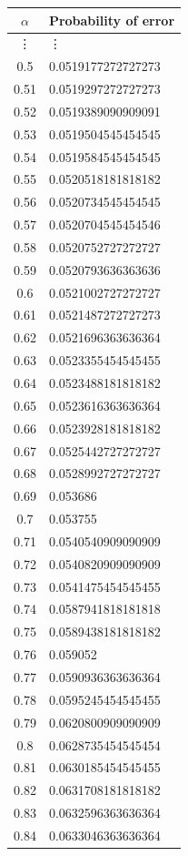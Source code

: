 \documentclass[11pt]{extarticle}
\begin{document}
\begin{enumerate}[(a)]
\begin{table}[ht!]
\begin{minipage}{0.4\textwidth}
\tiny
\begin{tabular}{cl}
\toprule
\textbf{$\alpha$} & \textbf{Probability of error} \\
\midrule
\vdots & \vdots \\
0.5 & 0.0519177272727273 \\
0.51 & 0.0519297272727273 \\
0.52 & 0.0519389090909091 \\
0.53 & 0.0519504545454545 \\
0.54 & 0.0519584545454545 \\
0.55 & 0.0520518181818182 \\
0.56 & 0.0520734545454545 \\
0.57 & 0.0520704545454546 \\
0.58 & 0.0520752727272727 \\
0.59 & 0.0520793636363636 \\
0.6 & 0.0521002727272727 \\
0.61 & 0.0521487272727273 \\
0.62 & 0.0521696363636364 \\
0.63 & 0.0523355454545455 \\
0.64 & 0.0523488181818182 \\
0.65 & 0.0523616363636364 \\
0.66 & 0.0523928181818182 \\
0.67 & 0.0525442727272727 \\
0.68 & 0.0528992727272727 \\
0.69 & 0.053686 \\
0.7 & 0.053755 \\
0.71 & 0.0540540909090909 \\
0.72 & 0.0540820909090909 \\
0.73 & 0.0541475454545455 \\
0.74 & 0.0587941818181818 \\
0.75 & 0.0589438181818182 \\
0.76 & 0.059052 \\
0.77 & 0.0590936363636364 \\
0.78 & 0.0595245454545455 \\
0.79 & 0.0620800909090909 \\
0.8 & 0.0628735454545454 \\
0.81 & 0.0630185454545455 \\
0.82 & 0.0631708181818182 \\
0.83 & 0.0632596363636364 \\
0.84 & 0.0633046363636364 \\

\end{tabular}
\end{minipage}
\end{table}
\end{enumerate}
\end{document}
